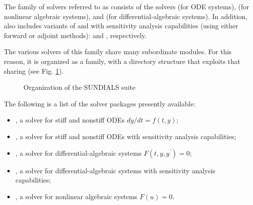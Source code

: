 %
The family of solvers referred to as {\sundials} consists of the solvers
{\cvode} (for ODE systems), {\kinsol} (for nonlinear algebraic
systems), and {\ida} (for differential-algebraic systems).  In addition,
{\sundials} also includes variants of {\cvode} and {\ida} with sensitivity analysis 
capabilities (using either forward or adjoint methods): {\cvodes} and {\idas},
respectively.

The various solvers of this family share many subordinate modules.
For this reason, it is organized as a family, with a directory
structure that exploits that sharing (see Fig. \ref{f:sunorg}).
\begin{figure}
\caption {Organization of the SUNDIALS suite}\label{f:sunorg}
\end{figure}
The following is a list of the solver packages presently available:
\begin{itemize}

\item {\cvode},  
  a solver for stiff and nonstiff ODEs $dy/dt = f(t,y)$;

\item {\cvodes},
  a solver for stiff and nonstiff ODEs
  with sensitivity analysis capabilities;

\item {\ida},
  a solver for differential-algebraic systems $F(t,y,y^\prime) = 0$;

\item {\idas},
  a solver for differential-algebraic systems
  with sensitivity analysis capabilities;

\item {\kinsol}, 
  a solver for nonlinear algebraic systems $F(u) = 0$.

\end{itemize}
